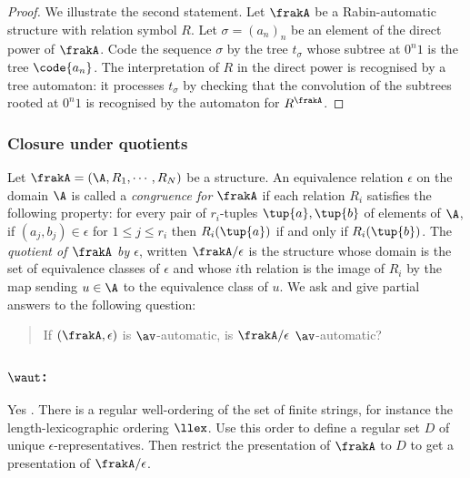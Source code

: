 \begin{proof}
We illustrate the second statement.
Let $\frakA$ be a Rabin-automatic structure with relation symbol $R$.
Let $\sigma = (a_n)_n$ be an element of the direct power of $\frakA$.
Code the sequence $\sigma$ by the tree $t_\sigma$ whose subtree at $0^n1$ is the tree $\code{a_n}$.
The interpretation of $R$ in the direct power is recognised by a tree automaton: it  processes $t_\sigma$ by checking
that the convolution of the subtrees rooted at $0^n1$ is recognised by the automaton for $R^\frakA$.
\end{proof}

\subsubsection*{Closure under quotients} \label{AS:subsub:quotient}
Let $\frakA = ({\A},R_1,\cdots,R_N)$ be a structure.
An equivalence relation $\epsilon$ on the domain ${\A}$ is called a {\em congruence for $\frakA$} if each relation $R_i$ satisfies the following property:
for every pair of $r_i$-tuples $\tup{a},\tup{b}$ of elements of ${\A}$, if $(a_j,b_j) \in  \epsilon$ for $1 \leq j \leq r_i$ then $R_i(\tup{a})$ if and only if $R_i(\tup{b})$.
The {\em quotient of $\frakA$ by $\epsilon$}, written $\frakA/\epsilon$ is the structure whose domain is the set of equivalence classes of $\epsilon$ and whose $i$th relation
is the image of $R_i$ by the map sending $u \in {\A}$ to the equivalence class of $u$. We ask and give partial answers to the following question:

\begin{quote}
If $(\frakA,\epsilon)$ is $\av$-automatic, is $\frakA/\epsilon$ $\av$-automatic?
\end{quote}

\subsubsection*{$\waut$:} Yes \cite{BlGr00}.
There is a regular well-ordering of the set of finite strings, for instance the length-lexicographic
ordering $\llex$. Use this order to define a regular set $D$ of unique $\epsilon$-representatives.
Then restrict the presentation of $\frakA$ to $D$ to get a presentation of $\frakA / \epsilon$.

